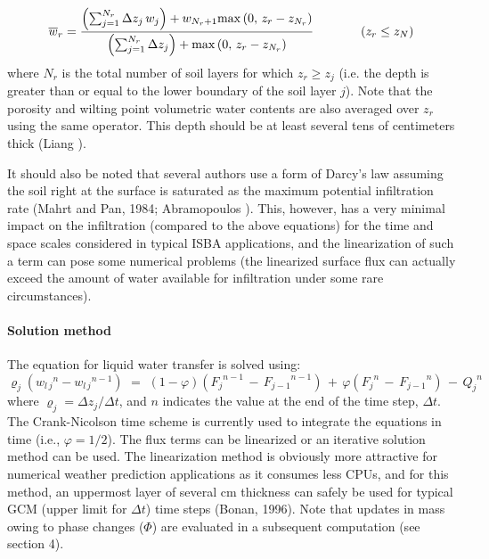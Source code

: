 \begin{equation}
\label{eq:water_content_avg_dif_vic}
{\overline w}_r = 
{\frac
{\left(\sum_{j=1}^{N_r} \Delta z_j \, w_j \right) + 
w_{N_r+1}{\rm max}\left(0,\,z_r-z_{N_r}\right)} 
{\left(\sum_{j=1}^{N_r} \Delta z_j \right) + 
{\rm max}\left( 0,\,z_r-z_{N_r}\right)}
}
\hskip.5in
\left(z_r \leq z_N\right)
\end{equation}
%
where $N_r$ is the total number of soil layers for which
$z_r \geq z_j$ (i.e. the depth is greater than or equal to
the lower boundary of the
soil layer $j$). Note that the porosity and wilting point volumetric water
contents are also averaged over $z_r$ using the same operator.
This depth should be at least several tens of centimeters 
thick (Liang ).

It should also be noted that several authors use a form
of Darcy's law assuming the soil right at the surface
is saturated as the maximum potential infiltration rate
(Mahrt and Pan, 1984\nocite{Mahrt1984}; 
Abramopoulos \nocite{Abramopoulos1988}).
This, however, has a very minimal impact on the infiltration
(compared to the above equations) for the time and space scales
considered in typical ISBA applications, and the linearization
of such a term can pose some numerical problems (the linearized
surface flux can actually exceed the amount of water available
for infiltration under some rare circumstances). 

\paragraph{Solution method}
%
The equation for liquid water transfer is
solved using:
%
\begin{equation}
\label{watercn}
\varrho_j
({w_{l\,j}}^{n}-{w_{l\,j}}^{n-1}) \,\,=\,\,
\left(1-\varphi\right)
\left({F_j}^{n-1} \,-\,{F_{j-1}}^{n-1} \right)
\,+\, 
\varphi
\left( {F_j}^{n} \,-\,{F_{j-1}}^{n}\right) 
\,-\, {Q_j}^n
\end{equation}
%
where $\varrho_j=\Delta z_j/\Delta t$, and 
$n$ indicates the value at the end of the time
step, $\Delta t$. 
The Crank-Nicolson time scheme is currently used to integrate
the equations in time (i.e., $\varphi=1/2$).
The flux terms can be linearized
or an iterative solution method can be used.
The linearization method is obviously more attractive for
numerical weather prediction applications as it consumes
less CPUs, and for this method,
an uppermost layer of several cm thickness can safely
be used for typical GCM (upper limit for $\Delta t$)
time steps (Bonan, 1996\nocite{Bonan1996}). 
Note that updates in mass owing to phase
changes ($\Phi$) are evaluated in a subsequent computation 
(see section 4).

